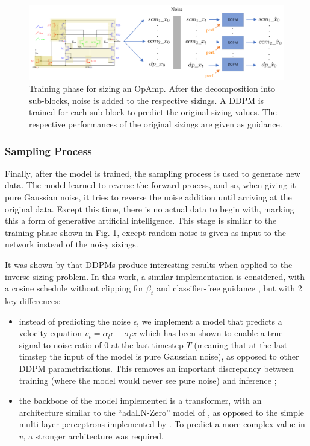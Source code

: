 \documentclass[conference]{IEEEtran}
\begin{document}
	\begin{figure}[h]
		\centering
		\includegraphics[width=\linewidth]{figures/DDPMSubBlockTraining}
		\setlength{\abovecaptionskip}{0ex}%
		\setlength{\belowcaptionskip}{-2ex}%
		\caption{Training phase for sizing an OpAmp. After the decomposition into sub-blocks, noise is added to the respective sizings. A DDPM is trained for each sub-block to predict the original sizing values. The respective performances of the original sizings are given as guidance.}
		\label{fig:DDPMtraining}
	\end{figure}
	
	\subsubsection{Sampling Process}
	Finally, after the model is trained, the sampling process is used to generate new data. The model learned to reverse the forward process, and so, when giving it pure Gaussian noise, it tries to reverse the noise addition until arriving at the original data. Except this time, there is no actual data to begin with, marking this a form of generative artificial intelligence. This stage is similar to the training phase shown in Fig. \ref{fig:DDPMtraining}, except random noise is given as input to the network instead of the noisy sizings.
	
	It was shown by \cite{eid24diffusion} that DDPMs produce interesting results when applied to the inverse sizing problem. In this work, a similar implementation is considered, with a cosine schedule without clipping \cite{lin2024commondiffusionnoiseschedules} for $\beta_t$ and classifier-free guidance \cite{ho2022classifierfreediffusionguidance}, but with 2 key differences:
	
	\begin{itemize}
		\item instead of predicting the noise $\epsilon$, we implement a model that predicts a velocity equation $v_{t}=\alpha_{t}\epsilon - \sigma_{t}x$ which has been shown to enable a true signal-to-noise ratio of $0$ at the last timestep $T$ (meaning that at the last timstep the input of the model is pure Gaussian noise), as opposed to other DDPM parametrizations. This removes an important discrepancy between training (where the model would never see pure noise) and inference \cite{lin2024commondiffusionnoiseschedules};
		\item the backbone of the model implemented  is a transformer, with an architecture similar to the ``adaLN-Zero'' model of  \cite{peebles2023scalablediffusionmodelstransformers}, as opposed to the simple multi-layer perceptrons implemented by \cite{eid24diffusion}. To predict a more complex value in $v$, a stronger architecture was required.
	\end{itemize}
	
\end{document}
